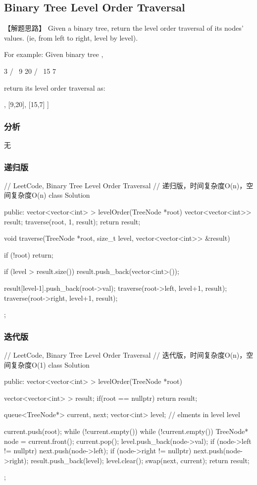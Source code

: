 \subsection{Binary Tree Level Order Traversal}
\label{sec:binary-tree-tevel-order-traversal}


【解题思路】
Given a binary tree, return the level order traversal of its nodes' values. (ie, from left to right, level by level).

For example:
Given binary tree ,
\begin{Code}
	3
	/ \
	9  20
	/  \
	15   7
\end{Code}
return its level order traversal as:
\begin{Code}
	[
	[3],
	[9,20],
	[15,7]
	]
\end{Code}


\subsubsection{分析}
无


\subsubsection{递归版}
\begin{Code}
	// LeetCode, Binary Tree Level Order Traversal
	// 递归版，时间复杂度O(n)，空间复杂度O(n)
	class Solution {
		public:
		vector<vector<int> > levelOrder(TreeNode *root) {
			vector<vector<int>> result;
			traverse(root, 1, result);
			return result;
		}
		
		void traverse(TreeNode *root, size_t level, vector<vector<int>> &result) {
			if (!root) return;
			
			if (level > result.size())
			result.push_back(vector<int>());
			
			result[level-1].push_back(root->val);
			traverse(root->left, level+1, result);
			traverse(root->right, level+1, result);
		}
	};
\end{Code}


\subsubsection{迭代版}
\begin{Code}
	// LeetCode, Binary Tree Level Order Traversal
	// 迭代版，时间复杂度O(n)，空间复杂度O(1)
	class Solution {
		public:
		vector<vector<int> > levelOrder(TreeNode *root) {
			vector<vector<int> > result;
			if(root == nullptr) return result;
			
			queue<TreeNode*> current, next;
			vector<int> level; // elments in level level
			
			current.push(root);
			while (!current.empty()) {
				while (!current.empty()) {
					TreeNode* node = current.front();
					current.pop();
					level.push_back(node->val);
					if (node->left != nullptr) next.push(node->left);
					if (node->right != nullptr) next.push(node->right);
				}
				result.push_back(level);
				level.clear();
				swap(next, current);
			}
			return result;
		}
	};
\end{Code}


